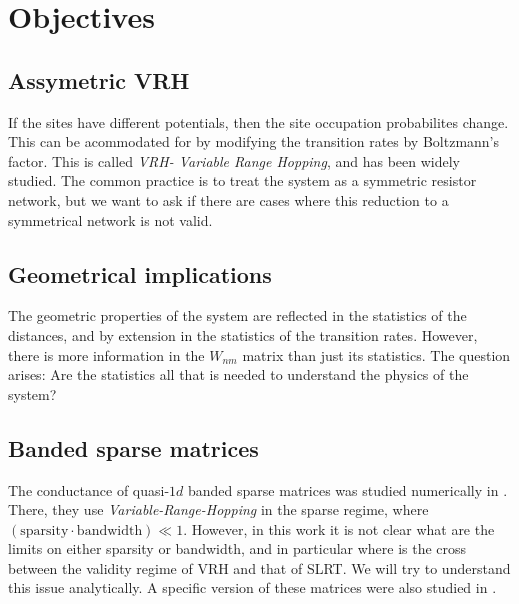 \chapter{Objectives}

\section{Assymetric VRH}

If the sites have different potentials, then the site occupation probabilites change. This can be acommodated for by modifying the transition rates by Boltzmann's factor. This is called \emph{VRH- Variable Range Hopping}\cite{ambegaokar_hopping_1971}, and has been widely studied. The common practice is to treat the system as a symmetric resistor network, but we want to ask if there are cases where this reduction to a symmetrical network is not valid.





\section{Geometrical implications}

The geometric properties of the system are reflected in the statistics of the distances, and by extension in the statistics of the transition rates. However, there is more information in the $W_{nm}$ matrix than just its statistics. The question arises: Are the statistics all that is needed to understand the physics of the system? 

\section{Banded sparse matrices}

The conductance of quasi-$1d$ banded sparse matrices was studied numerically in \cite{stotland_random-matrix_2010}. There, they use \emph{Variable-Range-Hopping} in the sparse regime, where 
$(\text{sparsity}\cdot \text{bandwidth}) \ll 1$. However, in this work it is not clear what are the limits on either sparsity or bandwidth, and in particular where is the cross between the validity regime of VRH and that of SLRT. We will try to understand this issue analytically. A specific version of these matrices were also studied in \cite{janssen_correlated_2000}.
